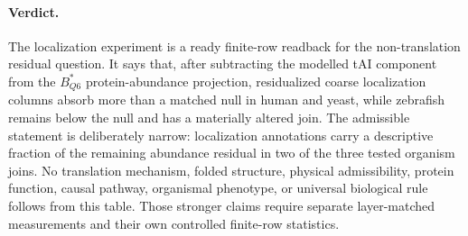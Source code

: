 \paragraph{Verdict.}
The localization experiment is a ready finite-row readback for the non-translation residual question.  It says that, after subtracting the modelled tAI component from the $B^*_{Q6}$ protein-abundance projection, residualized coarse localization columns absorb more than a matched null in human and yeast, while zebrafish remains below the null and has a materially altered join.  The admissible statement is deliberately narrow: localization annotations carry a descriptive fraction of the remaining abundance residual in two of the three tested organism joins.  No translation mechanism, folded structure, physical admissibility, protein function, causal pathway, organismal phenotype, or universal biological rule follows from this table.  Those stronger claims require separate layer-matched measurements and their own controlled finite-row statistics.